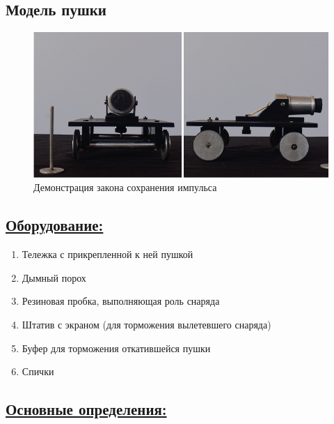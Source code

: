 \documentclass[14pt,a4paper,oneside]{extarticle}	%
\begin{document}

\begin{center}
	\subsection*{Модель пушки}
\end{center}

\begin{figure}[H] 
	\centering 	
	\includegraphics[width=1\linewidth]{cannon-1.png}
	\caption{Демонстрация  закона сохранения импульса}
	\label{cannon-1}
\end{figure}


\subsection*{\underline{Оборудование:}}

\begin{enumerate}
	\item Тележка с прикрепленной к ней пушкой
	\item Дымный порох
	\item Резиновая пробка, выполняющая роль снаряда
	\item Штатив с экраном (для торможения вылетевшего снаряда)
	\item Буфер для торможения откатившейся пушки
	\item Спички
\end{enumerate}

\newpage
\subsection*{\underline{Основные определения:}}
\end{document}
